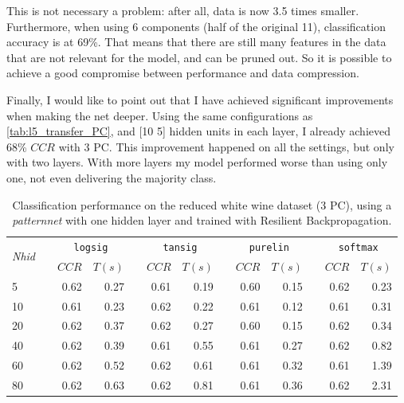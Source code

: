 \documentclass[a4paper, 10pt]{article}
\begin{document}
  This is not necessary a problem: after all, data is now 3.5 times smaller. 
  Furthermore, when using 6 components (half of the original 11), classification
  accuracy is at 69\%. That means that there are still many features in the data
  that are not relevant for the model, and can be pruned out. So it is possible
  to achieve a good compromise between performance and data compression.

  Finally, I would like to point out that I have achieved significant improvements
  when making the net deeper. Using the same configurations as 
  \autoref{tab:l5_transfer_PC}, and [10 5] hidden units in each layer, I already
  achieved 68\% $CCR$ with 3 PC. This improvement happened on all the settings, 
  but only with two layers. With more layers my model performed worse than using only
  one, not even delivering the majority class.

  \begin{table}[h]
    \centering
    \begin{tabular}{@{}lrrrrrrrrrrrr@{}}
      \toprule
      \multirow{2}{*}{\emph{Nhid}}&& \multicolumn{2}{c}{\texttt{logsig}} &&
        \multicolumn{2}{c}{\texttt{tansig}} && \multicolumn{2}{c}{\texttt{purelin}} 
        && \multicolumn{2}{c}{\texttt{softmax}} \\
      && $CCR$ & $T(s)$ && $CCR$ & $T(s)$ && $CCR$ & $T(s)$ && $CCR$ & $T(s)$ \\
      \midrule
       5 && 0.62 & 0.27 && 0.61 & 0.19 && 0.60 & 0.15 && 0.62 & 0.23 \\
      10 && 0.61 & 0.23 && 0.62 & 0.22 && 0.61 & 0.12 && 0.61 & 0.31 \\
      20 && 0.62 & 0.37 && 0.62 & 0.27 && 0.60 & 0.15 && 0.62 & 0.34 \\
      40 && 0.62 & 0.39 && 0.61 & 0.55 && 0.61 & 0.27 && 0.62 & 0.82 \\
      60 && 0.62 & 0.52 && 0.62 & 0.61 && 0.61 & 0.32 && 0.61 & 1.39 \\
      80 && 0.62 & 0.63 && 0.62 & 0.81 && 0.61 & 0.36 && 0.62 & 2.31 \\
    \bottomrule
  \end{tabular}
  \caption{Classification performance on the reduced white wine dataset (3 PC),
    using a \emph{patternnet} with one hidden layer and trained with 
Resilient Backpropagation.}
  \label{tab:l5_transfer_PC}
  \end{table}
\end{document}
